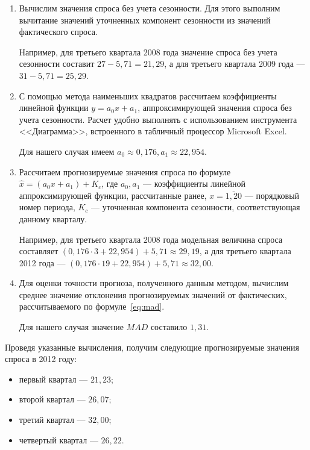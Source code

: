 \begin{enumerate}
\item Вычислим значения спроса без учета сезонности.
  Для этого выполним вычитание значений уточненных компонент сезонности из
  значений фактического спроса.

  Например, для третьего квартала 2008 года значение спроса
  без учета сезонности составит \( 27 - 5{,}71 = 21{,}29 \),
  а для третьего квартала 2009 года ---
  \( 31 - 5{,}71 = 25{,}29 \).

\item С помощью метода наименьших квадратов рассчитаем коэффициенты
  линейной функции \( y = a_0 x + a_1 \), аппроксимирующей значения спроса
  без учета сезонности. Расчет удобно выполнять с использованием инструмента
  <<Диаграмма>>, встроенного в табличный процессор Microsoft Excel.

  Для нашего случая имеем \( a_0 \approx 0{,}176, a_1 \approx 22{,}954 \).

\item Рассчитаем прогнозируемые значения спроса по формуле
  \( \hat{x} = (a_0 x + a_1) + K_c \), где
  \( a_0, a_1 \) --- коэффициенты линейной аппроксимирующей функции,
  рассчитанные ранее,
  \( x = \overline{1,20} \) --- порядковый номер периода,
  \( K_c \) --- уточненная компонента сезонности, соответствующая
  данному кварталу.

  Например, для третьего квартала 2008 года модельная величина спроса
  составляет
  \( ( 0{,}176 \cdot 3 + 22{,}954 ) + 5{,}71 \approx 29{,}19 \),
  а для третьего квартала 2012 года ---
  \( ( 0{,}176 \cdot 19 + 22{,}954 ) + 5{,}71 \approx 32{,}00 \).

\item Для оценки точности прогноза, полученного данным методом, вычислим
  среднее значение отклонения прогнозируемых значений от фактических,
  рассчитываемого по формуле~\ref{eq:mad}.

  Для нашего случая значение \( MAD \) составило $1{,}31$.
\end{enumerate}

Проведя указанные вычисления, получим следующие прогнозируемые значения
спроса в 2012 году:

\begin{itemize}
  \item первый квартал --- $21{,}23$;
  \item второй квартал --- $26{,}07$;
  \item третий квартал --- $32{,}00$;
  \item четвертый квартал --- $26{,}22$.
\end{itemize}

